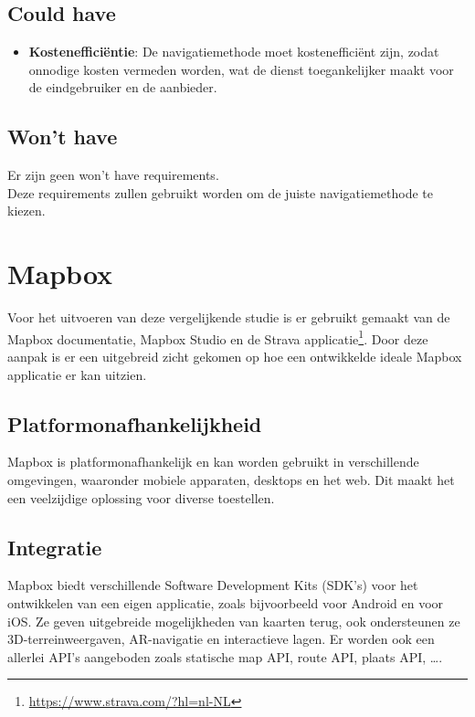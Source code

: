 \subsection*{Could have}
\begin{itemize}
    \item \textbf{Kostenefficiëntie}: De navigatiemethode moet kostenefficiënt zijn, zodat onnodige kosten vermeden worden, wat de dienst toegankelijker maakt voor de eindgebruiker en de aanbieder.
\end{itemize}

\subsection*{Won't have}

Er zijn geen won't have requirements.\\

Deze requirements zullen gebruikt worden om de juiste navigatiemethode te kiezen.


\section{Mapbox}
\label{sec:mapbox}

Voor het uitvoeren van deze vergelijkende studie is er gebruikt gemaakt van de Mapbox documentatie, Mapbox Studio en de Strava applicatie\footnote{\url{https://www.strava.com/?hl=nl-NL}}. Door deze aanpak is er een uitgebreid zicht gekomen op hoe een ontwikkelde ideale Mapbox applicatie er kan uitzien.

\subsection*{Platformonafhankelijkheid}
Mapbox is platformonafhankelijk en kan worden gebruikt in verschillende omgevingen, waaronder mobiele apparaten, desktops en het web. Dit maakt het een veelzijdige oplossing voor diverse toestellen.

\subsection*{Integratie}
Mapbox biedt verschillende Software Development Kits (SDK's) voor het ontwikkelen van een eigen applicatie, zoals bijvoorbeeld voor Android en voor iOS. Ze geven uitgebreide mogelijkheden van kaarten terug, ook ondersteunen ze 3D-terreinweergaven, AR-navigatie en interactieve lagen. Er worden ook een allerlei API's aangeboden zoals statische map API, route API, plaats API, \ldots .

